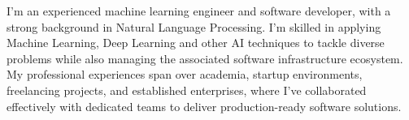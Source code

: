 

\begin{cvparagraph}



I'm an experienced machine learning engineer and software developer, with a strong background in Natural Language Processing. I'm skilled in applying Machine Learning, Deep Learning and other AI techniques to tackle diverse problems while also managing the associated software infrastructure ecosystem. My professional experiences span over academia, startup environments, freelancing projects, and established enterprises, where I've collaborated effectively with dedicated teams to deliver production-ready software solutions.
\end{cvparagraph}